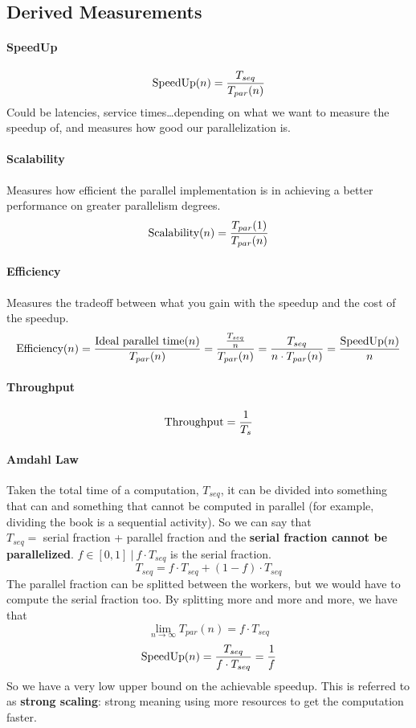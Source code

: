 \documentclass[10pt]{report}
\begin{document}
\subsection{Derived Measurements}
\paragraph{SpeedUp} $$\hbox{SpeedUp}(n) = \frac{T_{seq}}{T_{par}(n)}$$ Could be latencies, service times\ldots depending on what we want to measure the speedup of, and measures how good our parallelization is.
\paragraph{Scalability} Measures how efficient the parallel implementation is in achieving a better performance on greater parallelism degrees.
$$\hbox{Scalability}(n)=\frac{T_{par}(1)}{T_{par}(n)}$$
\paragraph{Efficiency}Measures the tradeoff between what you gain with the speedup and the cost of the speedup.
 $$\hbox{Efficiency}(n) = \frac{\hbox{Ideal parallel time}(n)}{T_{par}(n)} = \frac{\frac{T_{seq}}{n}}{T_{par}(n)} = \frac{T_{seq}}{n\cdot T_{par}(n)} = \frac{\hbox{SpeedUp}(n)}{n}$$
\paragraph{Throughput} $$\hbox{Throughput} = \frac{1}{T_s}$$
\paragraph{Amdahl Law} Taken the total time of a computation, $T_{seq}$, it can be divided into something that can and something that cannot be computed in parallel (for example, dividing the book is a sequential activity). So we can say that\\$T_{seq} =$ serial fraction + parallel fraction and the \textbf{serial fraction cannot be parallelized}. $f\in[0,1]\:|\:f\cdot T_{seq}$ is the serial fraction.
$$T_{seq} = f\cdot T_{seq} + (1-f)\cdot T_{seq}$$
The parallel fraction can be splitted between the workers, but we would have to compute the serial fraction too. By splitting more and more and more, we have that $$\lim_{n\to\infty} T_{par}(n) = f\cdot T_{seq}$$ $$\hbox{SpeedUp}(n) = \frac{T_{seq}}{f\cdot T_{seq}} = \frac{1}{f}$$
So we have a very low upper bound on the achievable speedup. This is referred to as \textbf{strong scaling}: strong meaning using more resources to get the computation faster.
\end{document}
